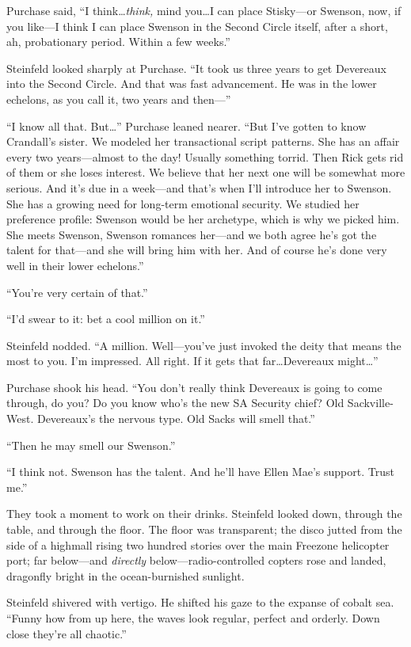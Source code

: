 Purchase said, ``I think\ldots \textit{think,} mind you\ldots I can place Stisky---or Swenson, now, if you like---I think I can place Swenson in the Second Circle itself, after a short, ah, probationary period. Within a few weeks.''

Steinfeld looked sharply at Purchase. ``It took us three years to get Devereaux into the Second Circle. And that was fast advancement. He was in the lower echelons, as you call it, two years and then---''

``I know all that. But\ldots '' Purchase leaned nearer. ``But I've gotten to know Crandall's sister. We modeled her transactional script patterns. She has an affair every two years---almost to the day! Usually something torrid. Then Rick gets rid of them or she loses interest. We believe that her next one will be somewhat more serious. And it's due in a week---and that's when I'll introduce her to Swenson. She has a growing need for long-term emotional security. We studied her preference profile: Swenson would be her archetype, which is why we picked him. She meets Swenson, Swenson romances her---and we both agree he's got the talent for that---and she will bring him with her. And of course he's done very well in their lower echelons.''

``You're very certain of that.''

``I'd swear to it: bet a cool million on it.''

Steinfeld nodded. ``A million. Well---you've just invoked the deity that means the most to you. I'm impressed. All right. If it gets that far\ldots Devereaux might\ldots ''

Purchase shook his head. ``You don't really think Devereaux is going to come through, do you? Do you know who's the new SA Security chief? Old Sackville-West. Devereaux's the nervous type. Old Sacks will smell that.''

``Then he may smell our Swenson.''

``I think not. Swenson has the talent. And he'll have Ellen Mae's support. Trust me.''

They took a moment to work on their drinks. Steinfeld looked down, through the table, and through the floor. The floor was transparent; the disco jutted from the side of a highmall rising two hundred stories over the main Freezone helicopter port; far below---and \textit{directly} below---radio-controlled copters rose and landed, dragonfly bright in the ocean-burnished sunlight.

Steinfeld shivered with vertigo. He shifted his gaze to the expanse of cobalt sea. ``Funny how from up here, the waves look regular, perfect and orderly. Down close they're all chaotic.''

